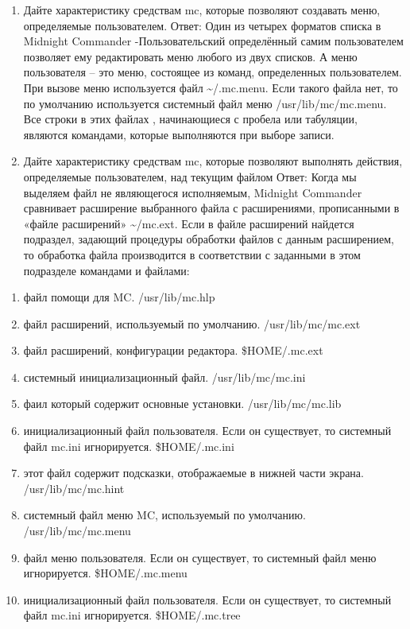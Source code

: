 \documentclass[
  english,
  russian,
  12pt,
  a4paper,
  DIV=11,
  numbers=noendperiod]{scrreprt}
\providecommand{\tightlist}{%
  \setlength{\itemsep}{0pt}\setlength{\parskip}{0pt}}
\begin{document}
\begin{enumerate}
\def\labelenumi{\arabic{enumi}.}
\setcounter{enumi}{8}
\item
  Дайте характеристику средствам mc, которые позволяют создавать меню,
  определяемые пользователем. Ответ: Один из четырех форматов списка в
  Midnight Commander -Пользовательский определённый самим пользователем
  позволяет ему редактировать меню любого из двух списков. А меню
  пользователя -- это меню, состоящее из команд, определенных
  пользователем. При вызове меню используется файл
  \textasciitilde/.mc.menu. Если такого файла нет, то по умолчанию
  используется системный файл меню /usr/lib/mc/mc.menu. Все строки в
  этих файлах , начинающиеся с пробела или табуляции, являются
  командами, которые выполняются при выборе записи.
\item
  Дайте характеристику средствам mc, которые позволяют выполнять
  действия, определяемые пользователем, над текущим файлом Ответ: Когда
  мы выделяем файл не являющегося исполняемым, Midnight Commander
  сравнивает расширение выбранного файла с расширениями, прописанными в
  «файле расширений» \textasciitilde/mc.ext. Если в файле расширений
  найдется подраздел, задающий процедуры обработки файлов с данным
  расширением, то обработка файла производится в соответствии с
  заданными в этом подразделе командами и файлами:
\end{enumerate}

\begin{enumerate}
\def\labelenumi{\alph{enumi})}
\tightlist
\item
  файл помощи для MC. /usr/lib/mc.hlp
\item
  файл расширений, используемый по умолчанию. /usr/lib/mc/mc.ext
\item
  файл расширений, конфигурации редактора. \$HOME/.mc.ext
\item
  системный инициализационный файл. /usr/lib/mc/mc.ini
\item
  фаил который содержит основные установки. /usr/lib/mc/mc.lib
\item
  инициализационный файл пользователя. Если он существует, то системный
  файл mc.ini игнорируется. \$HOME/.mc.ini
\item
  этот файл содержит подсказки, отображаемые в нижней части экрана.
  /usr/lib/mc/mc.hint
\item
  системный файл меню MC, используемый по умолчанию. /usr/lib/mc/mc.menu
\item
  файл меню пользователя. Если он существует, то системный файл меню
  игнорируется. \$HOME/.mc.menu
\item
  инициализационный файл пользователя. Если он существует, то системный
  файл mc.ini игнорируется. \$HOME/.mc.tree
\end{enumerate}


\printbibliography
\end{document}
